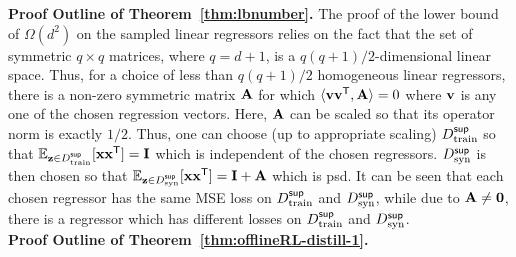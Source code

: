 {\bf Proof Outline of Theorem~\ref{thm:lbnumber}.} The proof of the lower bound of $\Omega(d^2)$ on the sampled linear regressors relies on the fact that the set of symmetric $q\times q$ matrices, where $q=d+1$, is a $q(q+1)/2$-dimensional linear space.  Thus, for a choice of less than $q(q+1)/2$ homogeneous linear regressors, there is a non-zero symmetric matrix $\mathbf{A}$ for which $\langle {\mathbf{v}}{\mathbf{v}}^{\sf T}, \mathbf{A}\rangle = 0$ where ${\mathbf{v}}$ is any one of the chosen regression vectors. Here, $\mathbf{A}$ can be scaled so that its operator norm is exactly $1/2$. Thus, one can choose (up to appropriate scaling) $D^{\sf sup}_{\textnormal{train}}$ so that $\mathbb{E}_{{\mathbf{z}} \in D^{\sf sup}_{\textnormal{train}}}[{\mathbf{x}}{\mathbf{x}}^{\sf T}] = \mathbf{I}$ which is independent of the chosen regressors. $D^{\sf sup}_{\textnormal{syn}}$ is then chosen so that $\mathbb{E}_{{\mathbf{z}} \in D^{\sf sup}_{\textnormal{syn}}}[{\mathbf{x}}{\mathbf{x}}^{\sf T}] = \mathbf{I} +\mathbf{A}$ which is psd. It can be seen that each chosen regressor has the same MSE loss on $D^{\sf sup}_{\textnormal{train}}$ and $D^{\sf sup}_{\textnormal{syn}}$, while due to $\mathbf{A} \neq \mathbf{0}$, there is a regressor which has different losses on $D^{\sf sup}_{\textnormal{train}}$ and $D^{\sf sup}_{\textnormal{syn}}$.\\


{\bf Proof Outline of Theorem~\ref{thm:offlineRL-distill-1}.}

